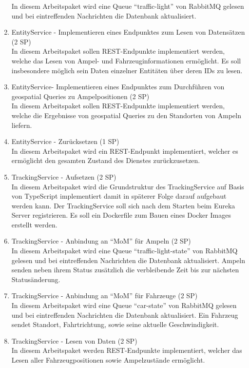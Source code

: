 \begin{enumerate}
  		In diesem Arbeitspaket wird eine Queue \enquote{traffic-light} von RabbitMQ gelesen und bei eintreffenden Nachrichten die Datenbank aktualisiert.
  \item EntityService - Implementieren eines Endpunktes zum Lesen von Datensätzen (2 SP)\\
  		In diesem Arbeitspaket sollen REST-Endpunkte implementiert werden, welche das Lesen von Ampel- und Fahrzeuginformationen ermöglicht.
  		Es soll insbesondere möglich sein Daten einzelner Entitäten über deren IDs zu lesen.
  \item EntityService- Implementieren eines Endpunktes zum Durchführen von geospatial Queries zu Ampelpositionen (2 SP)\\
  		In diesem Arbeitspaket sollen REST-Endpunkte implementiert werden, welche die Ergebnisse von geospatial Queries zu den Standorten von Ampeln liefern.
  \item EntityService - Zurücksetzen (1 SP)\\
 		In diesem Arbeitspaket wird ein REST-Endpunkt implementiert, welcher es ermöglicht den gesamten Zustand des Dienstes zurückzusetzen.
  \item TrackingService - Aufsetzen (2 SP)\\
  		In diesem Arbeitspaket wird die Grundstruktur des TrackingService auf Basis von TypeScript implementiert damit in späterer Folge darauf aufgebaut werden kann.
  		Der TrackingService soll sich nach dem Starten beim Eureka Server registrieren.
  		Es soll ein Dockerfile zum Bauen eines Docker Images erstellt werden.
  \item TrackingService - Anbindung an \enquote{MoM} für Ampeln (2 SP)\\
  		In diesem Arbeitspaket wird eine Queue \enquote{traffic-light-state} von RabbitMQ gelesen und bei eintreffenden Nachrichten die Datenbank aktualisiert.
  		Ampeln senden neben ihrem Status zusätzlich die verbleibende Zeit bis zur nächsten Statusänderung.
  \item TrackingService - Anbindung an \enquote{MoM} für Fahrzeuge (2 SP)\\
  		In diesem Arbeitspaket wird eine Queue \enquote{car-state} von RabbitMQ gelesen und bei eintreffenden Nachrichten die Datenbank aktualisiert.
  		Ein Fahrzeug sendet Standort, Fahrtrichtung, sowie seine aktuelle Geschwindigkeit.
  \item TrackingService - Lesen von Daten (2 SP)\\
  		In diesem Arbeitspaket werden REST-Endpunkte implementiert, welcher das Lesen aller Fahrzeugpositionen sowie Ampelzustände ermöglicht.

\end{enumerate}

